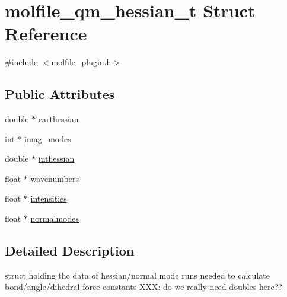 \hypertarget{structmolfile__qm__hessian__t}{\section{molfile\-\_\-qm\-\_\-hessian\-\_\-t \-Struct \-Reference}
\label{structmolfile__qm__hessian__t}
}


{\ttfamily \#include $<$molfile\-\_\-plugin.\-h$>$}

\subsection*{\-Public \-Attributes}
\begin{DoxyCompactItemize}
\item 
double $\ast$ \hyperlink{structmolfile__qm__hessian__t_af57f036fbd1248dd166681338fe0ad7a}{carthessian}
\item 
int $\ast$ \hyperlink{structmolfile__qm__hessian__t_aa68c9018c3bc3a8b290de04c35c43727}{imag\-\_\-modes}
\item 
double $\ast$ \hyperlink{structmolfile__qm__hessian__t_ab6e5942eeed3658b6e0fd43209d4018d}{inthessian}
\item 
float $\ast$ \hyperlink{structmolfile__qm__hessian__t_a80a3bb8710a3a6bc93d1d31777ddbe64}{wavenumbers}
\item 
float $\ast$ \hyperlink{structmolfile__qm__hessian__t_a41dcd0b1fc240696839f36fa5e715a2b}{intensities}
\item 
float $\ast$ \hyperlink{structmolfile__qm__hessian__t_a9800632b69e2bd2190db801f27163bb3}{normalmodes}
\end{DoxyCompactItemize}


\subsection{\-Detailed \-Description}
struct holding the data of hessian/normal mode runs needed to calculate bond/angle/dihedral force constants \-X\-X\-X\-: do we really need doubles here?? 

